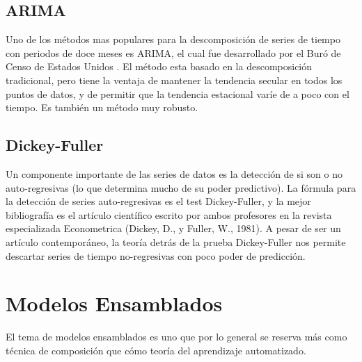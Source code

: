 \documentclass[letterpaper, spanish, 11pt]{report}
\begin{document}
\subsection{ARIMA}
Uno de los métodos mas populares para la descomposición de series de tiempo con periodos de doce meses es ARIMA, el cual fue desarrollado por el Buró de Censo de Estados Unidos \cite{hyndman}. El método esta basado en la descomposición tradicional, pero tiene la ventaja de mantener la tendencia secular en todos los puntos de datos, y de permitir que la tendencia estacional varíe de a poco con el tiempo. Es también un método muy robusto.

\subsection{Dickey-Fuller}
Un componente importante de las series de datos es la detección de si son o no auto-regresivas (lo que determina mucho de su poder predictivo). La fórmula para la detección de series auto-regresivas es el test Dickey-Fuller, y la mejor bibliografía es el artículo científico escrito por ambos profesores en la revista especializada Econometrica (Dickey, D., y Fuller, W., 1981). A pesar de ser un artículo contemporáneo, la teoría detrás de la prueba Dickey-Fuller nos permite descartar series de tiempo no-regresivas con poco poder de predicción.

\section{Modelos Ensamblados}
El tema de modelos ensamblados es uno que por lo general se reserva más como técnica de composición que cómo teoría del aprendizaje automatizado.
\end{document}

